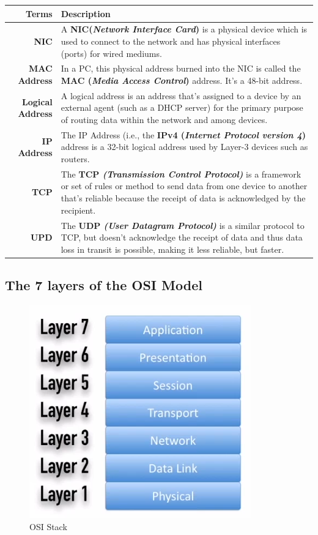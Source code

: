 \noindent
\begin{tabular}{rM{0.75}}
	\toprule
	\textbf{Terms} &\textbf{Description} \\
	\midrule
	\textbf{NIC}	&A \textbf{NIC(\textit{Network Interface Card})} is a physical device which is used to connect to the network and has physical interfaces (ports) for wired mediums. \\
	\midrule
	\textbf{MAC Address}	&In a PC, this physical address burned into the NIC is called the \textbf{MAC (\textit{Media Access Control})} address. It's a 48-bit address.\\
	\midrule
	\textbf{Logical Address}	&A logical address is an address that's assigned to a device by an external agent (such as a DHCP server) for the primary purpose of routing data within the network and among devices.\\
	\midrule
	\textbf{IP Address}	&The IP Address (i.e., the \textbf{IPv4 (\textit{Internet Protocol version 4})} address is a 32-bit logical address used by Layer-3 devices such as routers.\\
	\midrule
	\textbf{TCP}	&The \textbf{TCP \textit{(Transmission Control Protocol)}} is a framework or set of rules or method to send data from one device to another that's reliable because the receipt of data is acknowledged by the recipient.\\
	\midrule
	\textbf{UPD}	&The \textbf{UDP \textit{(User Datagram Protocol)}} is a similar protocol to TCP, but doesn't acknowledge the receipt of data and thus data loss in transit is possible, making it less reliable, but faster. \\
	\bottomrule
\end{tabular}

\subsection{The 7 layers of the OSI Model}

\begin{figure}[H]
	\centering
	\includegraphics[width=0.5\linewidth]{"Mod1/chapters/1.1.a OSI Stack"}
	\caption{OSI Stack}
	\label{fig:1 OSI Stack}
\end{figure}

